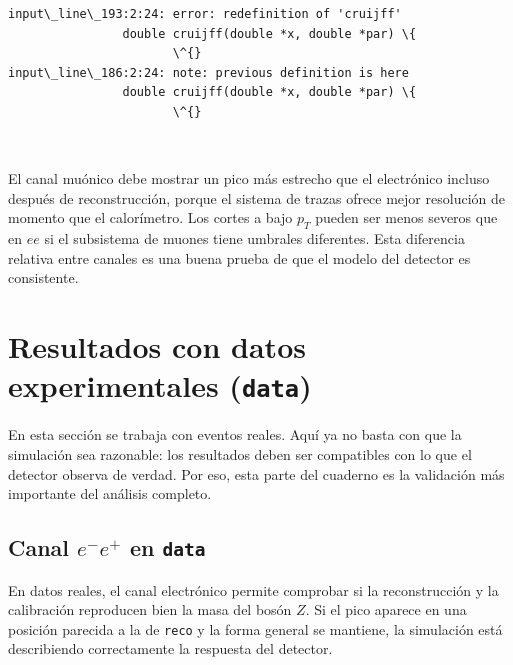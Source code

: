 \documentclass[11pt]{article}
\begin{document}
    \begin{Verbatim}[commandchars=\\\{\}]
input\_line\_193:2:24: error: redefinition of 'cruijff'
                double cruijff(double *x, double *par) \{
                       \^{}
input\_line\_186:2:24: note: previous definition is here
                double cruijff(double *x, double *par) \{
                       \^{}
    \end{Verbatim}

    \begin{center}
    \end{center}
    { \hspace*{\fill} \\}
    
    El canal muónico debe mostrar un pico más estrecho que el electrónico
incluso después de reconstrucción, porque el sistema de trazas ofrece
mejor resolución de momento que el calorímetro. Los cortes a bajo
\(p_T\) pueden ser menos severos que en \(ee\) si el subsistema de
muones tiene umbrales diferentes. Esta diferencia relativa entre canales
es una buena prueba de que el modelo del detector es consistente.

    \hypertarget{resultados-con-datos-experimentales-data}{%
\section{\texorpdfstring{Resultados con datos experimentales
(\texttt{data})}{Resultados con datos experimentales (data)}}\label{resultados-con-datos-experimentales-data}}

    En esta sección se trabaja con eventos reales. Aquí ya no basta con que
la simulación sea razonable: los resultados deben ser compatibles con lo
que el detector observa de verdad. Por eso, esta parte del cuaderno es
la validación más importante del análisis completo.

    \hypertarget{canal-e-e-en-data}{%
\subsection{\texorpdfstring{Canal \(e^-e^+\) en
\texttt{data}}{Canal e\^{}-e\^{}+ en data}}\label{canal-e-e-en-data}}

    En datos reales, el canal electrónico permite comprobar si la
reconstrucción y la calibración reproducen bien la masa del bosón \(Z\).
Si el pico aparece en una posición parecida a la de \texttt{reco} y la
forma general se mantiene, la simulación está describiendo correctamente
la respuesta del detector.
\end{document}
